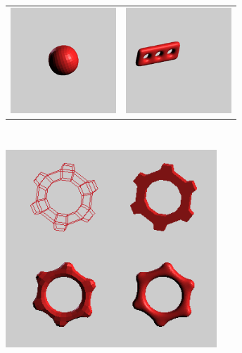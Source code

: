 \documentclass[12pt,a4paper]{scrartcl}
\begin{document}
\begin{center}
	\begin{tabular}{cc}
		\includegraphics[width=150px, height=150px]{Images/cube-3sd.png} 
		& \includegraphics[width=150px, height=150px]{Images/threeholes-3sd.png}  \\
	\end{tabular}
	\ \\
	\includegraphics[width=300px, height=300px]{Images/gear-stages.png} 
\end{center}
\end{document}
